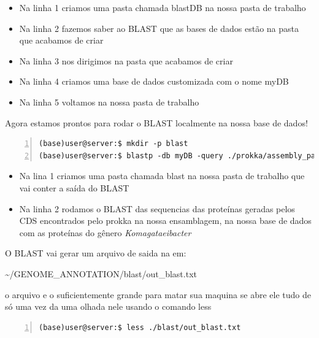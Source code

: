 \documentclass[letter,11pt]{book}
\begin{document}
\begin{itemize}
\item Na linha 1 criamos uma pasta chamada blastDB na nossa pasta de trabalho
\item Na linha 2 fazemos saber ao BLAST que as bases de dados estão na pasta que acabamos de criar 
\item Na linha 3 nos dirigimos na pasta que acabamos de criar
\item Na linha 4 criamos uma base de dados customizada com o nome myDB
\item Na linha 5 voltamos na nossa pasta de trabalho
\end{itemize}

Agora estamos prontos para rodar o BLAST localmente na nossa base de dados!

\begin{Verbatim}[commandchars=!\{\}, numbers=left,label= Rondando blast local,frame=topline,fontsize=\scriptsize]
(base)user@server:$ mkdir -p blast
(base)user@server:$ blastp -db myDB -query ./prokka/assembly_pacbio.faa -out ./blast/out_blast.txt
\end{Verbatim}
\begin{itemize}
\item Na lina 1 criamos uma pasta chamada blast na nossa pasta de trabalho que vai conter a saída do BLAST
\item Na linha 2 rodamos o BLAST das sequencias das proteínas geradas pelos CDS encontrados pelo prokka na nossa ensamblagem, na nossa base de dados com as proteínas do gênero  \emph{Komagataeibacter}
\end{itemize}

O BLAST vai gerar um arquivo de saida na em:


\sim/GENOME\_ANNOTATION/blast/out\_blast.txt



o arquivo e o suficientemente grande para matar sua maquina se abre ele tudo de só uma vez
da uma olhada nele usando o comando less


\begin{Verbatim}[commandchars=!\{\}, numbers=left,label= Resultados do BLAST local,frame=topline,fontsize=\scriptsize]
(base)user@server:$ less ./blast/out_blast.txt
\end{Verbatim}




\begin{appendices}

\label{unixguide}


\label{embossguide}


\label{blastguide}

\end{appendices} 
\end{document}
